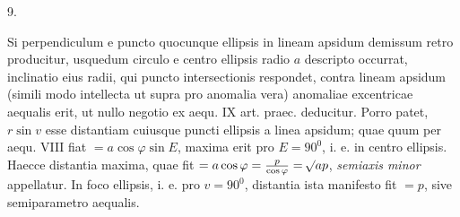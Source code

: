 \begin{center}
9.
\end{center}
Si perpendiculum e puncto quocunque ellipsis in lineam apsidum demissum retro producitur, usquedum circulo e centro ellipsis radio $a$ descripto occurrat, inclinatio eius radii, qui puncto intersectionis respondet, contra lineam apsidum (simili modo intellecta ut supra pro anomalia vera) anomaliae excentricae aequalis erit, ut nullo negotio ex aequ. IX art. praec. deducitur. Porro patet, $r\sin v$ esse distantiam cuiusque puncti ellipsis a linea apsidum; quae quum per aequ. VIII fiat $= a\cos\varphi\sin E$, maxima erit pro $E = 90^0$, i. e. in centro ellipsis. Haecce distantia maxima, quae fit $= a\cos\varphi = \frac{p}{\cos\varphi} = \mathord{{}^{}\!\surd}ap$, \emph{semiaxis minor} appellatur. In foco ellipsis, i. e. pro $v = 90^0$, distantia ista manifesto fit $= p$, sive semiparametro aequalis.
